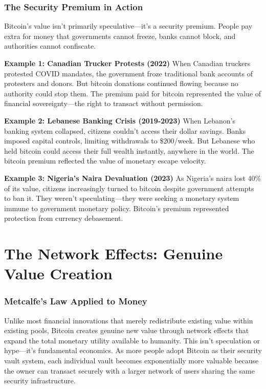 \documentclass[11pt,oneside]{book}
\begin{document}
\subsubsection{The Security Premium in Action}

Bitcoin's value isn't primarily speculative—it's a security premium. People pay extra for money that governments cannot freeze, banks cannot block, and authorities cannot confiscate.

\textbf{Example 1: Canadian Trucker Protests (2022)}
When Canadian truckers protested COVID mandates, the government froze traditional bank accounts of protesters and donors. But bitcoin donations continued flowing because no authority could stop them. The premium paid for bitcoin represented the value of financial sovereignty—the right to transact without permission.

\textbf{Example 2: Lebanese Banking Crisis (2019-2023)}
When Lebanon's banking system collapsed, citizens couldn't access their dollar savings. Banks imposed capital controls, limiting withdrawals to \$200/week. But Lebanese who held bitcoin could access their full wealth instantly, anywhere in the world. The bitcoin premium reflected the value of monetary escape velocity.

\textbf{Example 3: Nigeria's Naira Devaluation (2023)}
As Nigeria's naira lost 40\% of its value, citizens increasingly turned to bitcoin despite government attempts to ban it. They weren't speculating—they were seeking a monetary system immune to government monetary policy. Bitcoin's premium represented protection from currency debasement.

\section{The Network Effects: Genuine Value Creation}

\subsubsection{Metcalfe's Law Applied to Money}

Unlike most financial innovations that merely redistribute existing value within existing pools, Bitcoin creates genuine new value through network effects that expand the total monetary utility available to humanity. This isn't speculation or hype—it's fundamental economics. As more people adopt Bitcoin as their security vault system, each individual vault becomes exponentially more valuable because the owner can transact securely with a larger network of users sharing the same security infrastructure.
\end{document}
